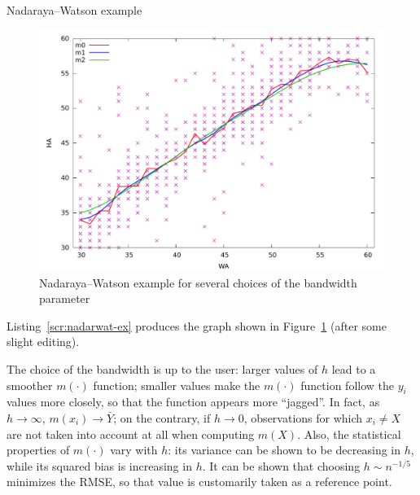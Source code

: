 \begin{script}[htbp]
  \caption{Nadaraya--Watson example}
  \label{scr:nadarwat-ex}
\end{script}

\begin{figure}[htbp]
  \centering
  \includegraphics[scale=0.5]{figures/nadarwat-ex}
  \caption{Nadaraya--Watson example for several choices of the bandwidth parameter}
  \label{fig:nadarwat-ex}
\end{figure}

Listing~\ref{scr:nadarwat-ex} produces the graph shown in
Figure~\ref{fig:nadarwat-ex} (after some slight editing).

The choice of the bandwidth is up to the user: larger values of $h$
lead to a smoother $m(\cdot)$ function; smaller values make the
$m(\cdot)$ function follow the $y_i$ values more closely, so that the
function appears more ``jagged''. In fact, as $h \to \infty$, $m(x_i)
\to \bar{Y}$; on the contrary, if $h $, observations for which
$x_i \ne X$ are not taken into account at all when computing $m(X)$.
Also, the statistical properties of $m(\cdot)$ vary with $h$: its
variance can be shown to be decreasing in $h$, while its squared bias
is increasing in $h$.  It can be shown that choosing $h \sim n^{-1/5}$
minimizes the RMSE, so that value is customarily taken as a reference
point.

